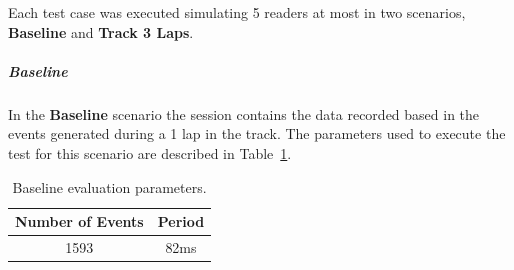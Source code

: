 Each test case was executed simulating 5 readers at most in two scenarios, \textbf{Baseline} and
\textbf{Track 3 Laps}.

\subparagraph{Baseline}
\label{subp:eval_exp_data_baseline}
In the \textbf{Baseline} scenario the session contains the data recorded based in the events generated
during a 1 lap in the track. The parameters used to execute the test for this scenario are described in
Table~\ref{tab:baseline_parameters}.

\begin{table}[ht!]
  \begin{tabular}{|c|c|}
    \hline
    Number of Events & Period \\ \hline
    1593             & 82ms   \\ \hline
  \end{tabular}
  \caption{Baseline evaluation parameters.}
  \label{tab:baseline_parameters}
\end{table}

